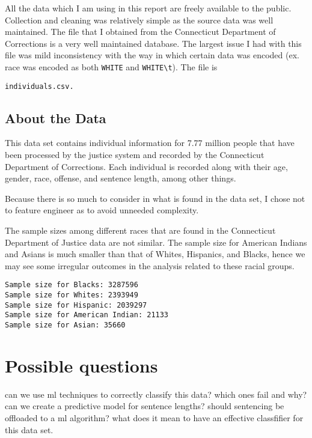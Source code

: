 \documentclass[11pt]{article}
\begin{document}
All the data which I am using in this report are freely available to the
public. Collection and cleaning was relatively simple as the source data
was well maintained. The file that I obtained from the Connecticut
Department of Corrections is a very well maintained database. The
largest issue I had with this file was mild inconsistency with the way
in which certain data was encoded (ex. race was encoded as both
\texttt{WHITE} and \texttt{WHITE\textbackslash{}t}). The file is

\begin{verbatim}
individuals.csv.
\end{verbatim}

\hypertarget{about-the-data}{%
\subsection{About the Data}\label{about-the-data}}

This data set contains individual information for 7.77 million people
that have been processed by the justice system and recorded by the
Connecticut Department of Corrections. Each individual is recorded along
with their age, gender, race, offense, and sentence length, among other
things.

Because there is so much to consider in what is found in the data set, I
chose not to feature engineer as to avoid unneeded complexity.

The sample sizes among different races that are found in the Connecticut
Department of Justice data are not similar. The sample size for American
Indians and Asians is much smaller than that of Whites, Hispanics, and
Blacks, hence we may see some irregular outcomes in the analysis related
to these racial groups.

    \begin{Verbatim}[commandchars=\\\{\}]
Sample size for Blacks: 3287596
Sample size for Whites: 2393949
Sample size for Hispanic: 2039297
Sample size for American Indian: 21133
Sample size for Asian: 35660

    \end{Verbatim}

    \hypertarget{possible-questions}{%
\section{Possible questions}\label{possible-questions}}

can we use ml techniques to correctly classify this data? which ones
fail and why? can we create a predictive model for sentence lengths?
should sentencing be offloaded to a ml algorithm? what does it mean to
have an effective classfifier for this data set.
\end{document}
